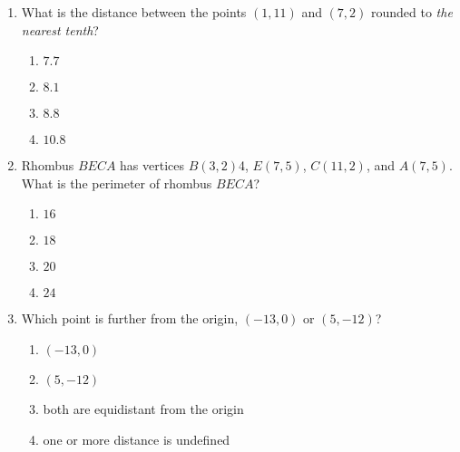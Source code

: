 \documentclass[12pt, twoside]{article}
\begin{document}
\begin{enumerate}
\item What is the distance between the points $(1,11)$ and $(7,2)$ rounded to \emph{the nearest tenth}?
  \begin{multicols}{2}
    \begin{enumerate}
      \item $7.7$
      \item $8.1$ 
      \item $8.8$
      \item $10.8$
    \end{enumerate}
  \end{multicols} \vspace{1cm}

\item Rhombus $BECA$ has vertices $B(3,2)$4, $E(7,5)$, $C(11,2)$, and $A(7,5)$. What is the perimeter of rhombus $BECA$?
  \begin{multicols}{2}
    \begin{enumerate}
      \item $16$
      \item $18$ 
      \item $20$
      \item $24$
    \end{enumerate}
  \end{multicols}

\item Which point is further from the origin, $(-13,0)$ or $(5,-12)$?
  \begin{multicols}{2}
    \begin{enumerate}
      \item $(-13,0)$
      \item $(5,-12)$ 
      \item both are equidistant from the origin
      \item one or more distance is undefined
    \end{enumerate}
  \end{multicols}


\end{enumerate}
\end{document}
